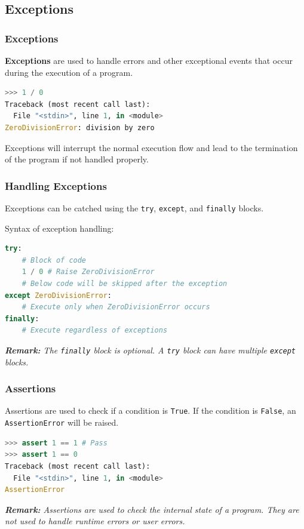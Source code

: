 \documentclass[beamer, en, version=2.0]{huangfusl-template}
\begin{document}
    \subsection{Exceptions}
    \begin{frame}[fragile]
        \frametitle{Exceptions}

        \textbf{Exceptions} are used to handle errors and other exceptional events that occur during the execution of a program.

\begin{lstlisting}[language=python]
>>> 1 / 0
Traceback (most recent call last):
  File "<stdin>", line 1, in <module>
ZeroDivisionError: division by zero
\end{lstlisting}

        Exceptions will interrupt the normal execution flow and lead to the termination of the program if not handled properly.
    \end{frame}
    \begin{frame}[fragile]
        \frametitle{Handling Exceptions}

        Exceptions can be catched using the {\footnotesize\verb|try|}, {\footnotesize\verb|except|}, and {\footnotesize\verb|finally|} blocks.

        Syntax of exception handling:

\begin{lstlisting}[language=python]
try:
    # Block of code
    1 / 0 # Raise ZeroDivisionError
    # Below code will be skipped after the exception
except ZeroDivisionError:
    # Execute only when ZeroDivisionError occurs
finally:
    # Execute regardless of exceptions
\end{lstlisting}

        {\footnotesize\itshape\textbf{Remark:} The {\scriptsize\verb|finally|} block is optional. A {\scriptsize\verb|try|} block can have multiple {\scriptsize\verb|except|} blocks.}
    \end{frame}
    \begin{frame}[fragile]
        \frametitle{Assertions}

        Assertions are used to check if a condition is {\scriptsize\verb|True|}. If the condition is {\scriptsize\verb|False|}, an {\scriptsize\verb|AssertionError|} will be raised.

\begin{lstlisting}[language=python]
>>> assert 1 == 1 # Pass
>>> assert 1 == 0
Traceback (most recent call last):
  File "<stdin>", line 1, in <module>
AssertionError
\end{lstlisting}

    {\footnotesize\itshape\textbf{Remark:} Assertions are used to check the internal state of a program. They are not used to handle runtime errors or user errors.}
    \end{frame}
\end{document}
